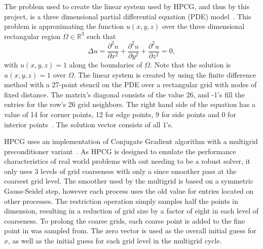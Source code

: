 The problem used to create the linear system used by HPCG, and thus by this project, is a three dimensional partial differential equation (PDE) model~\cite{Dongarra:2015:HPCG}.
This problem is approximating the function \(u(x, y, z)\) over the three dimensional rectangular region \(\Omega\in\mathbb{R}^3\) such that
\[
	\Delta u = \frac{\partial^2 u}{\partial x^2} + \frac{\partial^2 u}{\partial y^2} + \frac{\partial^2 u}{\partial z^2} = 0,
\] with \(u(x, y, z) = 1\) along the boundaries of \(\Omega\).
Note that the solution is \(u(x, y, z) = 1\) over \(\Omega\).
The linear system is created by using the finite difference method with a 27-point stencil on the PDE over a rectangular grid with nodes of fixed distance.
The matrix's diagonal consists of the value 26, and -1's fill the entries for the row's 26 grid neighbors.
The right hand side of the equation has a value of 14 for corner points, 12 for edge points, 9 for side points and 0 for interior points~\cite{Kincaid:2009:Numerical}.
The solution vector consists of all 1's.


HPCG uses an implementation of Conjugate Gradient algorithm with a multigrid preconditioner variant~\cite{Dongarra:2015:HPCG}.
As HPCG is designed to emulate the performance characteristics of real world problems with out needing to be a robust solver, it only uses 3 levels of grid coarseness with only a since smoother pass at the coarsest grid level.
The smoother used by the multigrid is based on a symmetric Gauss-Seidel step, however each process uses the old value for entries located on other processes.
The restriction operation simply samples half the points in dimension, resulting in a reduction of grid size by a factor of eight in each level of coarseness.
To prolong the coarse grids, each coarse point is added to the fine point in was sampled from.
The zero vector is used as the overall initial guess for \(x\), as well as the initial guess for each grid level in the multigrid cycle.

